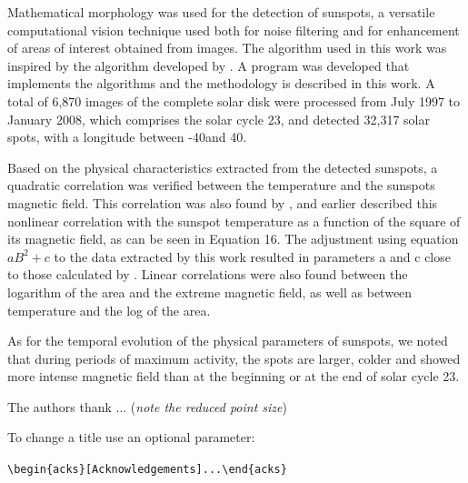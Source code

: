 \documentclass[namedreferences]{solarphysics}
\begin{document}
\begin{article}
Mathematical morphology was used for the detection of sunspots,
a versatile computational vision technique used both for noise filtering and for enhancement of areas of interest obtained from images.
The algorithm used in this work was inspired by the algorithm developed by \citealp{curto2008}.
A program was developed that implements the algorithms and the methodology is described in this work. 
A total of 6,870 images of the complete solar disk were processed from July 1997 to January 2008, 
which comprises the solar cycle 23,
and detected 32,317 solar spots, with a longitude between -40\degree and 40\degree.

Based on the physical characteristics extracted from the detected sunspots,
a quadratic correlation was verified between the temperature and the sunspots magnetic field. 
This correlation was also found by \citealp{Kopp1992}, 
and earlier \citealp{Dicke1970} described this nonlinear correlation with the sunspot temperature as a function of the square of its magnetic field,
as can be seen in Equation 16. The adjustment using equation $aB^2 + c $ to the data extracted by this work resulted in parameters a and c close to those calculated by \citealp{Dicke1970}.
Linear correlations were also found between the logarithm of the area and the extreme magnetic field, 
as well as between temperature and the log of the area.

As for the temporal evolution of the physical parameters of sunspots, we noted that during periods of maximum activity,
the spots are larger, colder and showed more intense magnetic field than at the beginning or at the end of solar cycle 23.

\begin{acks}
 The authors thank ... ({\it note the reduced point size})
\end{acks}

\noindent To change a title use an optional parameter:\par
\verb+\begin{acks}[Acknowledgements]...\end{acks}+





  


\end{article}
\end{document}
